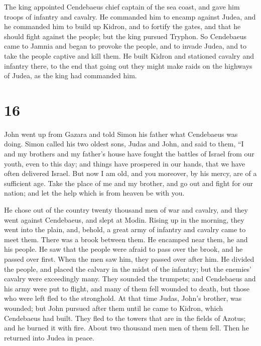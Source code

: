  The king appointed Cendebaeus chief captain of the sea
coast, and gave him troops of infantry and cavalry.  He
commanded him to encamp against Judea, and he commanded him to build up
Kidron, and to fortify the gates, and that he should fight against the
people; but the king pursued Tryphon.  So Cendebaeus came
to Jamnia and began to provoke the people, and to invade Judea, and to
take the people captive and kill them.  He built Kidron and
stationed cavalry and infantry there, to the end that going out they
might make raids on the highways of Judea, as the king had commanded
him.

\hypertarget{section-15}{%
\section{16}\label{section-15}}

 John went up from Gazara and told Simon his father what
Cendebaeus was doing.  Simon called his two oldest sons,
Judas and John, and said to them, ``I and my brothers and my father's
house have fought the battles of Israel from our youth, even to this
day; and things have prospered in our hands, that we have often
delivered Israel.  But now I am old, and you moreover, by
his mercy, are of a sufficient age. Take the place of me and my brother,
and go out and fight for our nation; and let the help which is from
heaven be with you.

 He chose out of the country twenty thousand men of war and
cavalry, and they went against Cendebaeus, and slept at Modin.
 Rising up in the morning, they went into the plain, and,
behold, a great army of infantry and cavalry came to meet them. There
was a brook between them.  He encamped near them, he and his
people. He saw that the people were afraid to pass over the brook, and
he passed over first. When the men saw him, they passed over after him.
 He divided the people, and placed the calvary in the midst
of the infantry; but the enemies' cavalry were exceedingly many.
 They sounded the trumpets; and Cendebaeus and his army were
put to flight, and many of them fell wounded to death, but those who
were left fled to the stronghold.  At that time Judas,
John's brother, was wounded; but John pursued after them until he came
to Kidron, which Cendebaeus had built.  They fled to the
towers that are in the fields of Azotus; and he burned it with fire.
About two thousand men men of them fell. Then he returned into Judea in
peace.

